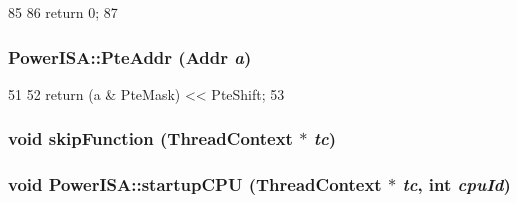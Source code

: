 \begin{DoxyCode}
85 {
86     return 0;
87 }
\end{DoxyCode}
\hypertarget{namespacePowerISA_a4e1f8d20048a1b7de1f6df74adbc22f3}{
\subsubsection[{PteAddr}]{ PowerISA::PteAddr ({\bf Addr} {\em a})}}
\label{namespacePowerISA_a4e1f8d20048a1b7de1f6df74adbc22f3}



\begin{DoxyCode}
51 {
52     return (a & PteMask) << PteShift;
53 }
\end{DoxyCode}
\hypertarget{namespacePowerISA_a2624d7d8bac3eb03de2eb6e83903c208}{
\subsubsection[{skipFunction}]{\setlength{\rightskip}{0pt plus 5cm}void skipFunction ({\bf ThreadContext} $\ast$ {\em tc})}}
\label{namespacePowerISA_a2624d7d8bac3eb03de2eb6e83903c208}
\hypertarget{namespacePowerISA_a6dd6526162d6ccc9efe5269417f96174}{
\subsubsection[{startupCPU}]{\setlength{\rightskip}{0pt plus 5cm}void PowerISA::startupCPU ({\bf ThreadContext} $\ast$ {\em tc}, \/  int {\em cpuId})}}
\label{namespacePowerISA_a6dd6526162d6ccc9efe5269417f96174}



